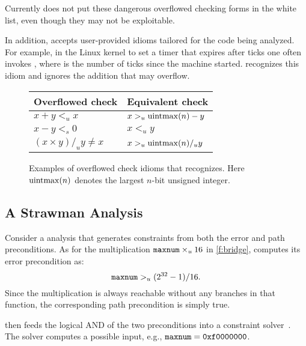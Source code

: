 Currently \sys does not put these dangerous overflowed checking
forms in the white list, even though they may not be exploitable.

In addition, \sys accepts user-provided idioms tailored for the
code being analyzed.  For example, in the Linux kernel to set a
timer that expires after  ticks one often invokes
, where  is the
number of ticks since the machine started.  \sys recognizes
this idiom and ignores the addition  that may
overflow.

\begin{figure}
\centering
\begin{tabular}{ll}
\toprule
Overflowed check & Equivalent check \\ \midrule
$x + y <_u x$ & $x >_u \operatorname{uintmax}(n) - y$ \\
$x - y <_s 0$ & $x <_u y$ \\
$(x \times y) /_u y \neq x$ & $x >_u \operatorname{uintmax}(n) /_u y$   \\
\bottomrule
\end{tabular}
\caption{Examples of overflowed check idioms that \sys recognizes.
Here $\operatorname{uintmax}(n)$ denotes the largest $n$-bit unsigned integer.}
\label{f:whitelist}
\end{figure}


\subsection{A Strawman Analysis}

Consider a \naive analysis that generates constraints from both the
error and path preconditions.  As for the multiplication $\texttt{maxnum}
\times_u 16$ in \autoref{f:bridge}, \sys computes its error
precondition as:
\begin{equation*}
\texttt{maxnum} >_u (2^{32} - 1) / 16.
\end{equation*}
Since the multiplication is always reachable without any branches
in that function, the corresponding path precondition is simply true.

\sys then feeds the logical AND of the two preconditions into a
constraint solver~\cite{boolector}.  The solver computes a possible
input, e.g., $\texttt{maxnum} = \texttt{0xf0000000}$.

